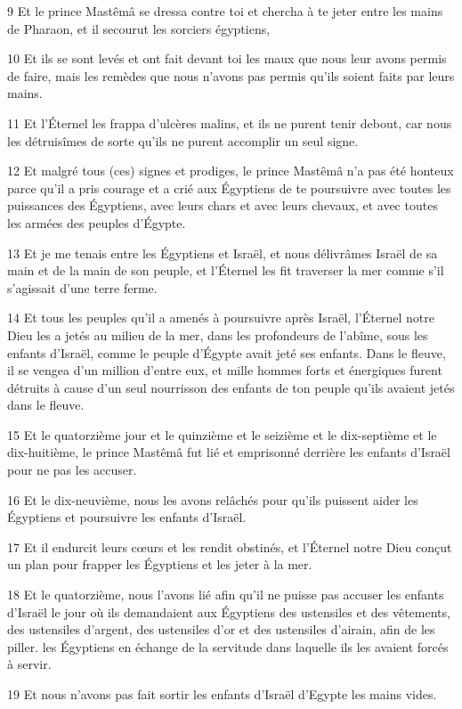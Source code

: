 \par 9 Et le prince Mastêmâ se dressa contre toi et chercha à te jeter entre les mains de Pharaon, et il secourut les sorciers égyptiens,
\par 10 Et ils se sont levés et ont fait devant toi les maux que nous leur avons permis de faire, mais les remèdes que nous n'avons pas permis qu'ils soient faits par leurs mains.
\par 11 Et l'Éternel les frappa d'ulcères malins, et ils ne purent tenir debout, car nous les détruisîmes de sorte qu'ils ne purent accomplir un seul signe.
\par 12 Et malgré tous (ces) signes et prodiges, le prince Mastêmâ n'a pas été honteux parce qu'il a pris courage et a crié aux Égyptiens de te poursuivre avec toutes les puissances des Égyptiens, avec leurs chars et avec leurs chevaux, et avec toutes les armées des peuples d'Égypte.
\par 13 Et je me tenais entre les Égyptiens et Israël, et nous délivrâmes Israël de sa main et de la main de son peuple, et l'Éternel les fit traverser la mer comme s'il s'agissait d'une terre ferme.
\par 14 Et tous les peuples qu'il a amenés à poursuivre après Israël, l'Éternel notre Dieu les a jetés au milieu de la mer, dans les profondeurs de l'abîme, sous les enfants d'Israël, comme le peuple d'Égypte avait jeté ses enfants. Dans le fleuve, il se vengea d'un million d'entre eux, et mille hommes forts et énergiques furent détruits à cause d'un seul nourrisson des enfants de ton peuple qu'ils avaient jetés dans le fleuve.
\par 15 Et le quatorzième jour et le quinzième et le seizième et le dix-septième et le dix-huitième, le prince Mastêmâ fut lié et emprisonné derrière les enfants d'Israël pour ne pas les accuser.
\par 16 Et le dix-neuvième, nous les avons relâchés pour qu'ils puissent aider les Égyptiens et poursuivre les enfants d'Israël.
\par 17 Et il endurcit leurs cœurs et les rendit obstinés, et l'Éternel notre Dieu conçut un plan pour frapper les Égyptiens et les jeter à la mer.
\par 18 Et le quatorzième, nous l'avons lié afin qu'il ne puisse pas accuser les enfants d'Israël le jour où ils demandaient aux Égyptiens des ustensiles et des vêtements, des ustensiles d'argent, des ustensiles d'or et des ustensiles d'airain, afin de les piller. les Égyptiens en échange de la servitude dans laquelle ils les avaient forcés à servir.
\par 19 Et nous n'avons pas fait sortir les enfants d'Israël d'Egypte les mains vides.

